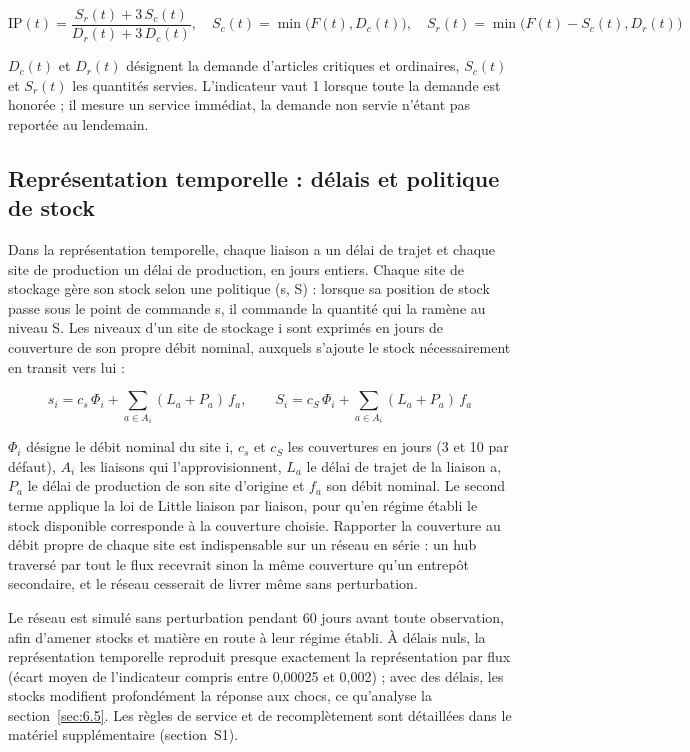 \begin{equation}
\mathrm{IP}(t) = \frac{S_r(t) + 3\,S_c(t)}{D_r(t) + 3\,D_c(t)}, \quad S_c(t) = \min\big(F(t), D_c(t)\big), \quad S_r(t) = \min\big(F(t) - S_c(t), D_r(t)\big)
\label{eq:1}
\end{equation}

$D_{c}(t)$ et $D_{r}(t)$ désignent la demande d'articles critiques et ordinaires, $S_{c}(t)$ et $S_{r}(t)$ les quantités servies. L'indicateur vaut 1 lorsque toute la demande est honorée ; il mesure un service immédiat, la demande non servie n'étant pas reportée au lendemain.

\subsection{Représentation temporelle : délais et politique de stock}
\label{sec:3.3}

Dans la représentation temporelle, chaque liaison a un délai de trajet et chaque site de production un délai de production, en jours entiers. Chaque site de stockage gère son stock selon une politique (s, S) \citep{scarf1960} : lorsque sa position de stock passe sous le point de commande s, il commande la quantité qui la ramène au niveau S. Les niveaux d'un site de stockage i sont exprimés en jours de couverture de son propre débit nominal, auxquels s'ajoute le stock nécessairement en transit vers lui :

\begin{equation}
s_i = c_s\,\Phi_i + \sum_{a \in A_i} (L_a + P_a)\, f_a, \qquad S_i = c_S\,\Phi_i + \sum_{a \in A_i} (L_a + P_a)\, f_a
\label{eq:2}
\end{equation}

$\Phi_{i}$ désigne le débit nominal du site i, $c_{s}$ et $c_{S}$ les couvertures en jours (3 et 10 par défaut), $A_{i}$ les liaisons qui l'approvisionnent, $L_{a}$ le délai de trajet de la liaison a, $P_{a}$ le délai de production de son site d'origine et $f_{a}$ son débit nominal. Le second terme applique la loi de Little \citep{little1961} liaison par liaison, pour qu'en régime établi le stock disponible corresponde à la couverture choisie. Rapporter la couverture au débit propre de chaque site est indispensable sur un réseau en série : un hub traversé par tout le flux recevrait sinon la même couverture qu'un entrepôt secondaire, et le réseau cesserait de livrer même sans perturbation.

Le réseau est simulé sans perturbation pendant 60 jours avant toute observation, afin d'amener stocks et matière en route à leur régime établi. À délais nuls, la représentation temporelle reproduit presque exactement la représentation par flux (écart moyen de l'indicateur compris entre 0,00025 et 0,002) ; avec des délais, les stocks modifient profondément la réponse aux chocs, ce qu'analyse la section~\ref{sec:6.5}. Les règles de service et de recomplètement sont détaillées dans le matériel supplémentaire (section~S1).

